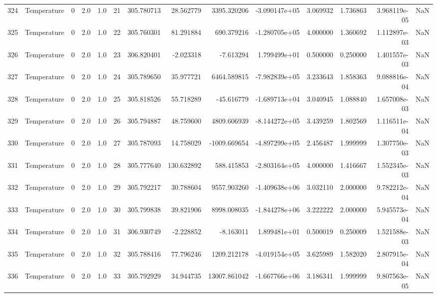 \begin{tabular}{llrrrrrrrrrrrr}
324 &  Temperature &       0 &  2.0 &  1.0 &   21 &  305.780713 &    28.562779 &    3395.320206 & -3.090147e+05 &  3.069932 &  1.736863 &  3.968119e-05 &      NaN \\
325 &  Temperature &       0 &  2.0 &  1.0 &   22 &  305.760301 &    81.291884 &     690.379216 & -1.280705e+05 &  4.000000 &  1.360692 &  1.112897e-03 &      NaN \\
326 &  Temperature &       0 &  2.0 &  1.0 &   23 &  306.820401 &    -2.023318 &      -7.613294 &  1.799499e+01 &  0.500000 &  0.250000 &  1.401557e-03 &      NaN \\
327 &  Temperature &       0 &  2.0 &  1.0 &   24 &  305.789650 &    35.977721 &    6464.589815 & -7.982839e+05 &  3.233643 &  1.858363 &  9.088816e-04 &      NaN \\
328 &  Temperature &       0 &  2.0 &  1.0 &   25 &  305.818526 &    55.718289 &     -45.616779 & -1.689713e+04 &  3.040945 &  1.088840 &  1.657008e-03 &      NaN \\
329 &  Temperature &       0 &  2.0 &  1.0 &   26 &  305.794887 &    48.759600 &    4809.606939 & -8.144272e+05 &  3.439259 &  1.802569 &  1.116511e-04 &      NaN \\
330 &  Temperature &       0 &  2.0 &  1.0 &   27 &  305.787093 &    14.758029 &   -1009.669654 & -4.897299e+05 &  2.456487 &  1.999999 &  1.307750e-03 &      NaN \\
331 &  Temperature &       0 &  2.0 &  1.0 &   28 &  305.777640 &   130.632892 &     588.415853 & -2.803164e+05 &  4.000000 &  1.416667 &  1.552345e-03 &      NaN \\
332 &  Temperature &       0 &  2.0 &  1.0 &   29 &  305.792217 &    30.788604 &    9557.903260 & -1.409638e+06 &  3.032110 &  2.000000 &  9.782212e-04 &      NaN \\
333 &  Temperature &       0 &  2.0 &  1.0 &   30 &  305.799838 &    39.821906 &    8998.008035 & -1.844278e+06 &  3.222222 &  2.000000 &  5.945573e-04 &      NaN \\
334 &  Temperature &       0 &  2.0 &  1.0 &   31 &  306.930749 &    -2.228852 &      -8.163011 &  1.899481e+01 &  0.500019 &  0.250009 &  1.521588e-03 &      NaN \\
335 &  Temperature &       0 &  2.0 &  1.0 &   32 &  305.788416 &    77.796246 &    1209.212178 & -4.019154e+05 &  3.625989 &  1.582020 &  2.807915e-04 &      NaN \\
336 &  Temperature &       0 &  2.0 &  1.0 &   33 &  305.792929 &    34.944735 &   13007.861042 & -1.667766e+06 &  3.186341 &  1.999999 &  9.807563e-05 &      NaN \\

\end{tabular}
